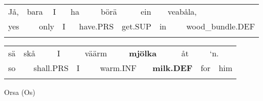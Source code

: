 \begin{tabular}{llllllllllllll}
\lsptoprule
Jå, & \multicolumn{2}{l}{bara

} & \multicolumn{2}{l}{I

} & \multicolumn{2}{l}{ha

} & \multicolumn{2}{l}{börä

} & \multicolumn{2}{l}{ein

} & \multicolumn{2}{l}{veabåla,

} & \\
\multicolumn{2}{l}{yes

} & \multicolumn{2}{l}{only

} & \multicolumn{2}{l}{I

} & \multicolumn{2}{l}{have.PRS

} & \multicolumn{2}{l}{get.SUP

} & \multicolumn{2}{l}{in

} & \multicolumn{2}{l}{wood\_bundle.DEF

}\\
\lspbottomrule
\end{tabular}

\begin{tabular}{llllllllllllll}
\lsptoprule
sä & \multicolumn{2}{l}{skå

} & \multicolumn{2}{l}{I

} & \multicolumn{2}{l}{väärm

} & \multicolumn{2}{l}{{\bfseries mjölka}

} & \multicolumn{2}{l}{åt

} & \multicolumn{2}{l}{‘n.

} & \\
\multicolumn{2}{l}{so

} & \multicolumn{2}{l}{shall.PRS

} & \multicolumn{2}{l}{I

} & \multicolumn{2}{l}{warm.INF

} & \multicolumn{2}{l}{{\bfseries milk.DEF}

} & \multicolumn{2}{l}{for

} & \multicolumn{2}{l}{him

}\\
\lspbottomrule
\end{tabular}

\begin{styleExLtrTblii}
Orsa (Os)

\end{styleExLtrTblii}

